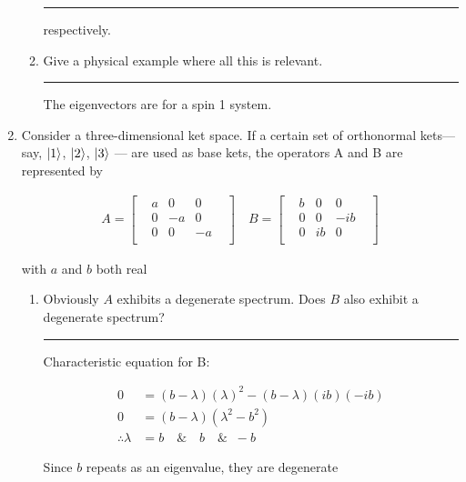 \documentclass[12pt, oneside]{article}
\newenvironment{answer}
  {\vspace*{0.2cm} \rule{12cm}{0.02cm} \vspace*{0.2cm}}
  {\vspace*{0.2cm}}
\begin{document}
\begin{enumerate}
\begin{enumerate}
\begin{answer}
        respectively.
      \end{answer}

      \item Give a physical example where all this is relevant.

      \begin{answer}
        The eigenvectors are for a spin 1 system.
      \end{answer}
    \end{enumerate}

    \item Consider a three-dimensional ket space. If a certain set of orthonormal kets—say, $\ket{1}$, $\ket{2}$, $\ket{3}$ --- are used as base kets, the operators A and B are represented by

    \begin{align*}
      A = \begin{bmatrix}
            & a & 0  & 0  & \\
            & 0 & -a & 0  & \\
            & 0 & 0  & -a & \\
          \end{bmatrix}
      \quad B = \begin{bmatrix}
                  & b & 0  & 0   & \\
                  & 0 & 0  & -ib & \\
                  & 0 & ib & 0   & \\
                \end{bmatrix}
    \end{align*}

    with $a$ and $b$ both real

    \begin{enumerate}
      \item Obviously $A$ exhibits a degenerate spectrum. Does $B$ also exhibit a degenerate spectrum?

      \begin{answer}
        Characteristic equation for B:

        \begin{align*}
          0 &= (b-\lambda)(\lambda)^2-(b-\lambda)(ib)(-ib)\\
          0 &= (b-\lambda)(\lambda^2 - b^2) \\
          \therefore \lambda &= b \quad \& \quad b \quad \& \; \; -b
        \end{align*}

        Since $b$ repeats as an eigenvalue, they are degenerate
      \end{answer}


\end{enumerate}
\end{enumerate}
\end{document}
